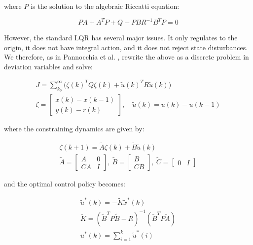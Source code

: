 where $P$ is the solution to the algebraic Riccatti equation:

\begin{equation}\label{eq:ARE}
	PA + A^TP + Q - PBR^{-1}B^TP = 0
\end{equation}

However, the standard LQR has several major issues. It only regulates to the origin, it does not have integral action, and it does not reject state disturbances. We therefore, as in Pannocchia et al. \cite{Pannocchia2015a}, rewrite the above as a discrete problem in deviation variables and solve:

\begin{equation}\label{eq:LagrangeProblemDeviation}
	\begin{gathered}
	J = \sum_{k_0}^{\infty} \big(\zeta(k)^TQ\zeta(k) + \tilde{u}(k)^TR\tilde{u}(k)\big) \\
	\zeta = \begin{bmatrix}	x(k)-x(k-1) \\ y(k)-r(k) \end{bmatrix}, \quad \tilde{u}(k) = u(k)-u(k-1) 
	\end{gathered}
\end{equation} 

where the constraining dynamics are given by:

\begin{equation}\label{eq:VelocityMatrices}
	\begin{gathered}
		\zeta(k+1) = \tilde{A}\zeta(k) + \tilde{B}\tilde{u}(k) \\
		\tilde{A} = \begin{bmatrix} A & 0 \\ CA & I	\end{bmatrix}, \ 
		\tilde{B} = \begin{bmatrix} B \\ CB	\end{bmatrix}, \ \tilde{C} = \begin{bmatrix} 0 & I	\end{bmatrix}
	\end{gathered}
\end{equation}

and the optimal control policy becomes:

\begin{equation}\label{eq:OptimalVFLQRPolicy}
\begin{gathered}
\tilde{u}^*(k)  = -\tilde{K}\tilde{x}^*(k) \\
\tilde{K} = (\tilde{B}^TP\tilde{B}-R)^{-1}(\tilde{B}^TP\tilde{A}) \\
u^*(k) = \sum_{i=1}^{k} \tilde{u}^*(i)
\end{gathered}
\end{equation}


